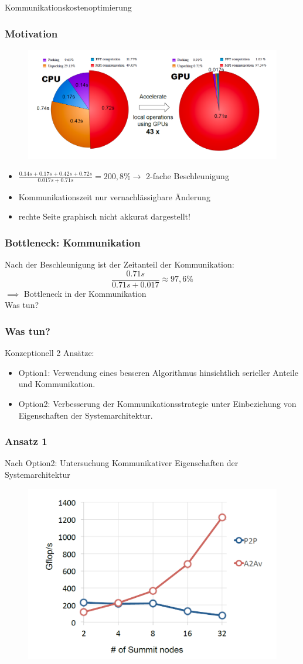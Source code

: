 \frame
{
	\begin{center}
		\Large Kommunikationskostenoptimierung \normalsize
	\end{center}
}
\frame
{
	\frametitle{Motivation}
	\begin{figure}[h!]
		\centering
		\includegraphics[width=\linewidth, keepaspectratio]{../res/speedup.png}
	\end{figure}

	\begin{itemize}
		\item $\frac{0.14s+0.17s+0.42s+0.72s}{0.017s+0.71s}=200,8\% \rightarrow$  2-fache Beschleunigung
		\item Kommunikationszeit nur vernachlässigbare Änderung
		\item rechte Seite graphisch nicht akkurat dargestellt!
	\end{itemize}
}
\frame
{
	\frametitle{Bottleneck: Kommunikation}
	Nach der Beschleunigung ist der  Zeitanteil der Kommunikation:\\
	$$\frac{0.71s}{0.71s+0.017}\approx97,6\%$$
	$\implies$ Bottleneck in der Kommunikation\\
	\large Was tun? \normalsize
}
\frame
{
	\frametitle{Was tun?}
	Konzeptionell 2 Ansätze:
	\begin{itemize}
		\item Option1: Verwendung eines besseren Algorithmus hinsichtlich serieller Anteile und Kommunikation.
		\item Option2: Verbesserung der Kommunikationsstrategie unter Einbeziehung von Eigenschaften der Systemarchitektur.
	\end{itemize}
}
\frame
{
	\frametitle{Ansatz 1}
	Nach Option2: Untersuchung Kommunikativer Eigenschaften der Systemarchitektur
	\begin{figure}[h!]
		\centering
		\includegraphics[width=0.7\linewidth, keepaspectratio]{./res/bench.png}
	\end{figure}
}
